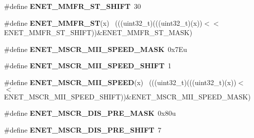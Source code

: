 \begin{DoxyCompactItemize}
\item 
\hypertarget{group___e_n_e_t___register___masks_gabff166a3d09c782f336fac767d5ab5ab}{}\#define {\bfseries E\+N\+E\+T\+\_\+\+M\+M\+F\+R\+\_\+\+S\+T\+\_\+\+S\+H\+I\+F\+T}~30\label{group___e_n_e_t___register___masks_gabff166a3d09c782f336fac767d5ab5ab}

\item 
\hypertarget{group___e_n_e_t___register___masks_ga1d3f19b033fb438e79bb0417e3e11488}{}\#define {\bfseries E\+N\+E\+T\+\_\+\+M\+M\+F\+R\+\_\+\+S\+T}(x)                                                ~(((uint32\+\_\+t)(((uint32\+\_\+t)(x))$<$$<$E\+N\+E\+T\+\_\+\+M\+M\+F\+R\+\_\+\+S\+T\+\_\+\+S\+H\+I\+F\+T))\&E\+N\+E\+T\+\_\+\+M\+M\+F\+R\+\_\+\+S\+T\+\_\+\+M\+A\+S\+K)\label{group___e_n_e_t___register___masks_ga1d3f19b033fb438e79bb0417e3e11488}

\item 
\hypertarget{group___e_n_e_t___register___masks_ga1cb1a68c64288642ffaba2a5866990cc}{}\#define {\bfseries E\+N\+E\+T\+\_\+\+M\+S\+C\+R\+\_\+\+M\+I\+I\+\_\+\+S\+P\+E\+E\+D\+\_\+\+M\+A\+S\+K}~0x7\+Eu\label{group___e_n_e_t___register___masks_ga1cb1a68c64288642ffaba2a5866990cc}

\item 
\hypertarget{group___e_n_e_t___register___masks_ga82d16561cec7a3078e68de4d7c9c72f2}{}\#define {\bfseries E\+N\+E\+T\+\_\+\+M\+S\+C\+R\+\_\+\+M\+I\+I\+\_\+\+S\+P\+E\+E\+D\+\_\+\+S\+H\+I\+F\+T}~1\label{group___e_n_e_t___register___masks_ga82d16561cec7a3078e68de4d7c9c72f2}

\item 
\hypertarget{group___e_n_e_t___register___masks_gaf90a9ced6193fd8c26dd31945934472d}{}\#define {\bfseries E\+N\+E\+T\+\_\+\+M\+S\+C\+R\+\_\+\+M\+I\+I\+\_\+\+S\+P\+E\+E\+D}(x)                                  ~(((uint32\+\_\+t)(((uint32\+\_\+t)(x))$<$$<$E\+N\+E\+T\+\_\+\+M\+S\+C\+R\+\_\+\+M\+I\+I\+\_\+\+S\+P\+E\+E\+D\+\_\+\+S\+H\+I\+F\+T))\&E\+N\+E\+T\+\_\+\+M\+S\+C\+R\+\_\+\+M\+I\+I\+\_\+\+S\+P\+E\+E\+D\+\_\+\+M\+A\+S\+K)\label{group___e_n_e_t___register___masks_gaf90a9ced6193fd8c26dd31945934472d}

\item 
\hypertarget{group___e_n_e_t___register___masks_ga9387f22e8849499571e0755718ff4d73}{}\#define {\bfseries E\+N\+E\+T\+\_\+\+M\+S\+C\+R\+\_\+\+D\+I\+S\+\_\+\+P\+R\+E\+\_\+\+M\+A\+S\+K}~0x80u\label{group___e_n_e_t___register___masks_ga9387f22e8849499571e0755718ff4d73}

\item 
\hypertarget{group___e_n_e_t___register___masks_gaa4bd1e56f919591ae627d376271da560}{}\#define {\bfseries E\+N\+E\+T\+\_\+\+M\+S\+C\+R\+\_\+\+D\+I\+S\+\_\+\+P\+R\+E\+\_\+\+S\+H\+I\+F\+T}~7\label{group___e_n_e_t___register___masks_gaa4bd1e56f919591ae627d376271da560}


\end{DoxyCompactItemize}
